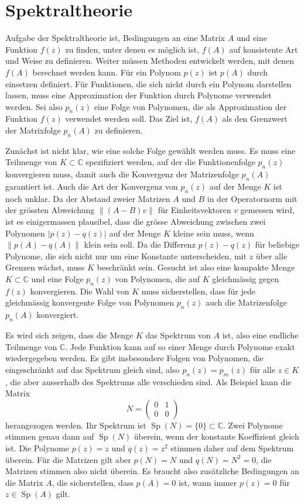 %
%
% 
\section{Spektraltheorie
\label{buch:section:spektraltheorie}}
Aufgabe der Spektraltheorie ist, Bedingungen an eine Matrix $A$ und eine
Funktion $f(z)$ zu finden, unter denen es möglich ist, $f(A)$ auf 
konsistente Art und Weise zu definieren.
Weiter müssen Methoden entwickelt werden, mit denen $f(A)$ berechnet
werden kann.
Für ein Polynom $p(z)$ ist $p(A)$ durch einsetzen definiert.
Für Funktionen, die sich nicht durch ein Polynom darstellen lassen,
muss eine Approximation der Funktion durch Polynome verwendet werden.
Sei also $p_n(z)$ eine Folge von Polynomen, die als Approximation der
Funktion $f(z)$ verwendet werden soll.
Das Ziel ist, $f(A)$ als den Grenzwert der Matrixfolge $p_n(A)$
zu definieren.

Zunächst ist nicht klar, wie eine solche Folge gewählt werden muss.
Es muss eine Teilmenge von $K\subset\mathbb{C}$ spezifiziert werden,
auf der die Funktionenfolge $p_n(z)$ konvergieren muss,
damit auch die Konvergenz der Matrizenfolge $p_n(A)$ garantiert ist.
Auch die Art der Konvergenz von $p_n(z)$ auf der Menge $K$ ist noch
unklar.
Da der Abstand zweier Matrizen $A$ und $B$ in der Operatornorm
mit der grössten Abweichung $\|(A-B)v\|$ für Einheitsvektoren $v$
gemessen wird, ist es einigermassen plausibel, dass
die grösse Abweichung zwischen zwei Polynomen $|p(z) - q(z)|$ auf
der Menge $K$ kleine sein muss, wenn $\|p(A)-q(A)\|$ klein 
sein soll.
Da die Differenz $p(z)-q(z)$ für beliebige Polynome, die sich nicht
nur um eine Konstante unterscheiden, mit $z$ über alle Grenzen wächst,
muss $K$ beschränkt sein.
Gesucht ist also eine kompakte Menge $K\subset\mathbb{C}$ und eine
Folge $p_n(z)$ von Polynomen, die auf $K$ gleichmässig gegen $f(z)$
konvergieren.
Die Wahl von $K$ muss sicherstellen, dass für jede gleichmässig
konvergente Folge von Polynomen $p_n(z)$ auch die Matrizenfolge
$p_n(A)$ konvergiert.

Es wird sich zeigen, dass die Menge $K$ das Spektrum von $A$ ist,
also eine endliche Teilmenge von $\mathbb{C}$.
Jede Funktion kann auf so einer Menge durch Polynome exakt wiedergegeben
werden.
Es gibt insbesondere Folgen von Polynomen, die eingeschränkt
auf das Spektrum gleich sind, also $p_n(z)=p_m(z)$ für alle $z\in K$,
die aber ausserhalb des Spektrums alle verschieden sind.
Als Beispiel kann die Matrix 
\[
N=\begin{pmatrix}0&1\\0&0\end{pmatrix}
\]
herangezogen werden.
Ihr Spektrum ist $\operatorname{Sp}(N)=\{0\}\subset\mathbb{C}$.
Zwei Polynome stimmen genau dann auf $\operatorname{Sp}(N)$ überein,
wenn der konstante Koeffizient gleich ist.
Die Polynome $p(z)=z$ und $q(z)=z^2$ stimmen daher auf dem Spektrum
überein.
Für die Matrizen gilt aber $p(N)=N$ und $q(N)=N^2=0$, die Matrizen
stimmen also nicht überein.
Es braucht also zusätzliche Bedingungen an die Matrix $A$, die
sicherstellen, dass $p(A)=0$ ist, wann immer $p(z)=0$ für
$z\in\operatorname{Sp}(A)$ gilt.

